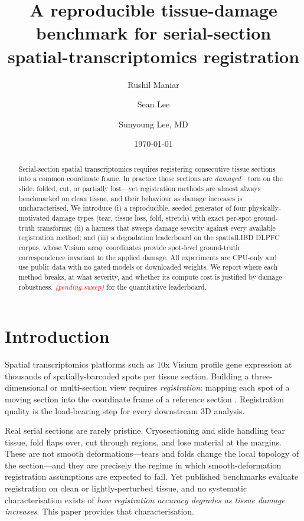 \documentclass[11pt]{article}
\title{\textbf{A reproducible tissue-damage benchmark for serial-section\\
spatial-transcriptomics registration}}
\author[1]{Rushil Maniar}
\author[1]{Sean Lee}
\author[2]{Sunyoung Lee, MD}
\affil[1]{Sutura Genomics \quad \texttt{\{rushil,sean\}@suturagenomics.bio}}
\affil[2]{Department of \todo{dept}, MD Anderson Cancer Center \quad \texttt{sslee1@mdanderson.org}}
\date{\today}
\newcommand{\pending}{\textcolor{red}{\emph{(pending sweep)}}}
\begin{document}
\maketitle

\begin{abstract}
Serial-section spatial transcriptomics requires registering consecutive tissue
sections into a common coordinate frame. In practice those sections are
\emph{damaged}---torn on the slide, folded, cut, or partially lost---yet
registration methods are almost always benchmarked on clean tissue, and their
behaviour as damage increases is uncharacterised. We introduce (i) a
reproducible, seeded generator of four physically-motivated damage types
(tear, tissue loss, fold, stretch) with exact per-spot ground-truth transforms;
(ii) a harness that sweeps damage severity against every available registration
method; and (iii) a degradation leaderboard on the spatialLIBD DLPFC corpus,
whose Visium array coordinates provide spot-level ground-truth correspondence
invariant to the applied damage. All experiments are CPU-only and use public
data with no gated models or downloaded weights. We report where each method
breaks, at what severity, and whether its compute cost is justified by
damage robustness. \pending{} for the quantitative leaderboard.
\end{abstract}

\section{Introduction}
Spatial transcriptomics platforms such as 10x Visium profile gene expression at
thousands of spatially-barcoded spots per tissue section. Building a
three-dimensional or multi-section view requires \emph{registration}: mapping
each spot of a moving section into the coordinate frame of a reference section
\cite{zeira2022paste}. Registration quality is the load-bearing step for every
downstream 3D analysis.

Real serial sections are rarely pristine. Cryosectioning and slide handling tear
tissue, fold flaps over, cut through regions, and lose material at the margins.
These are not smooth deformations---tears and folds change the local topology of
the section---and they are precisely the regime in which smooth-deformation
registration assumptions are expected to fail. Yet published benchmarks evaluate
registration on clean or lightly-perturbed tissue, and no systematic
characterisation exists of \emph{how registration accuracy degrades as tissue
damage increases}. This paper provides that characterisation.
\end{document}

